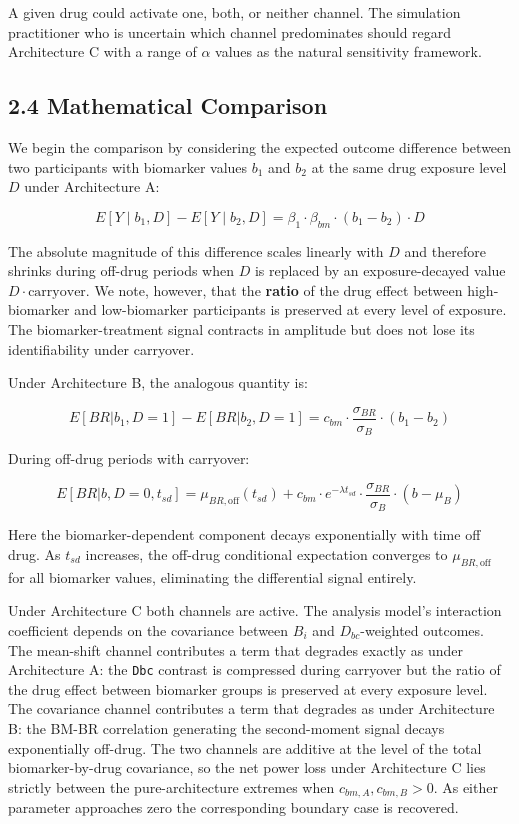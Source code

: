 \documentclass[
  11pt,
]{article}
\begin{document}
A given drug could activate one, both, or neither channel. The
simulation practitioner who is uncertain which channel predominates
should regard Architecture C with a range of \(\alpha\) values as the
natural sensitivity framework.

\subsection{2.4 Mathematical Comparison}

We begin the comparison by considering the expected outcome difference
between two participants with biomarker values \(b_1\) and \(b_2\) at
the same drug exposure level \(D\) under Architecture A:

\[E[Y \mid b_1, D] - E[Y \mid b_2, D] = \beta_1 \cdot \beta_{bm}
\cdot (b_1 - b_2) \cdot D\]

The absolute magnitude of this difference scales linearly with \(D\) and
therefore shrinks during off-drug periods when \(D\) is replaced by an
exposure-decayed value \(D \cdot \text{carryover}\). We note, however,
that the \textbf{ratio} of the drug effect between high-biomarker and
low-biomarker participants is preserved at every level of exposure. The
biomarker-treatment signal contracts in amplitude but does not lose its
identifiability under carryover.

Under Architecture B, the analogous quantity is:

\[E[BR | b_1, D=1] - E[BR | b_2, D=1] = c_{bm} \cdot
\frac{\sigma_{BR}}{\sigma_B} \cdot (b_1 - b_2)\]

During off-drug periods with carryover:

\[E[BR | b, D=0, t_{sd}] = \mu_{BR,\text{off}}(t_{sd}) +
c_{bm} \cdot e^{-\lambda t_{sd}} \cdot
\frac{\sigma_{BR}}{\sigma_B} \cdot (b - \mu_B)\]

Here the biomarker-dependent component decays exponentially with time
off drug. As \(t_{sd}\) increases, the off-drug conditional expectation
converges to \(\mu_{BR,\text{off}}\) for all biomarker values,
eliminating the differential signal entirely.

Under Architecture C both channels are active. The analysis model's
interaction coefficient depends on the covariance between \(B_i\) and
\(D_{bc}\)-weighted outcomes. The mean-shift channel contributes a term
that degrades exactly as under Architecture A: the \texttt{Dbc} contrast
is compressed during carryover but the ratio of the drug effect between
biomarker groups is preserved at every exposure level. The covariance
channel contributes a term that degrades as under Architecture B: the
BM-BR correlation generating the second-moment signal decays
exponentially off-drug. The two channels are additive at the level of
the total biomarker-by-drug covariance, so the net power loss under
Architecture C lies strictly between the pure-architecture extremes when
\(c_{bm,A}, c_{bm,B} > 0\). As either parameter approaches zero the
corresponding boundary case is recovered.
\end{document}
